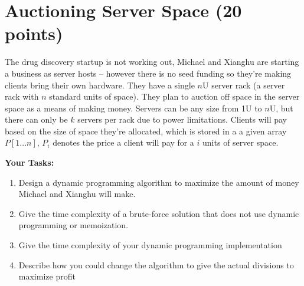 \documentclass{article}[12pt]
\begin{document}
\newpage
\section{Auctioning Server Space (20 points)}

The drug discovery startup is not working out, Michael and Xianghu are starting a business as server hosts -- however there is no seed funding so they're making clients bring their own hardware. They have a single $n$U server rack (a server rack with $n$ standard units of space). They plan to auction off space in the server space as a means of making money. Servers can be any size from 1U to $n$U, but there can only be $k$ servers per rack due to power limitations. Clients will pay based on the size of space they're allocated, which is stored in a a given array $P[1...n]$, $P_i$ denotes the price a client will pay for a $i$ units of server space.

\noindent\textbf{Your Tasks:}
\begin{enumerate}
    \item Design a dynamic programming algorithm to maximize the amount of money Michael and Xianghu will make.
    \item Give the time complexity of a brute-force solution that does not use dynamic programming or memoization.
    \item Give the time complexity of your dynamic programming implementation
    \item Describe how you could change the algorithm to give the actual divisions to maximize profit
\end{enumerate}
\end{document}
